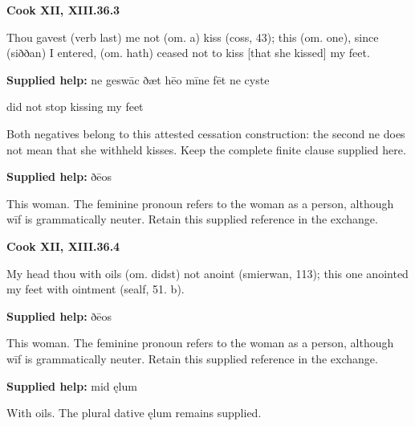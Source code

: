 \par\begin{minipage}{\linewidth}\raggedright
\textbf{Cook XII, XIII.36.3}

Thou gavest (verb last) me not (om. a) kiss (coss, 43); this (om. one), since (siððan) I entered, (om. hath) ceased not to kiss [that she kissed] my feet.

\textbf{Supplied help:} ne geswāc ðæt hēo mīne fēt ne cyste

did not stop kissing my feet

Both negatives belong to this attested cessation construction: the second ne does not mean that she withheld kisses. Keep the complete finite clause supplied here.

\textbf{Supplied help:} ðēos

This woman. The feminine pronoun refers to the woman as a person, although wīf is grammatically neuter. Retain this supplied reference in the exchange.

\end{minipage}\par\addvspace{4pt}

\par\begin{minipage}{\linewidth}\raggedright
\textbf{Cook XII, XIII.36.4}

My head thou with oils (om. didst) not anoint (smierwan, 113); this one anointed my feet with ointment (sealf, 51. b).

\textbf{Supplied help:} ðēos

This woman. The feminine pronoun refers to the woman as a person, although wīf is grammatically neuter. Retain this supplied reference in the exchange.

\textbf{Supplied help:} mid ęlum

With oils. The plural dative ęlum remains supplied.

\end{minipage}\par\addvspace{4pt}

